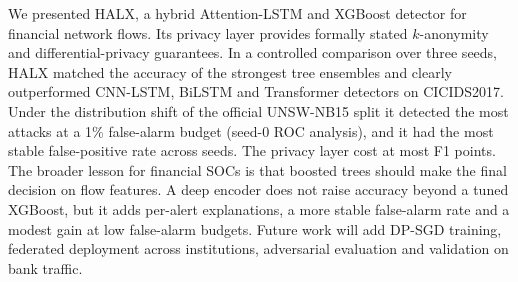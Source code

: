 We presented HALX, a hybrid Attention-LSTM and XGBoost detector for
financial network flows. Its privacy layer provides formally stated
$k$-anonymity and differential-privacy guarantees. In a controlled
comparison over three seeds, HALX matched the accuracy of the strongest
tree ensembles and clearly outperformed CNN-LSTM, BiLSTM and Transformer
detectors on CICIDS2017. Under the distribution shift of the official
UNSW-NB15 split it detected the most attacks at a 1\% false-alarm budget
(seed-0 ROC analysis), and it had the most stable false-positive rate
across seeds. The privacy layer
cost at most \PRIVCOSTMAX{} F1 points. The broader
lesson for financial SOCs is that boosted trees should make the final
decision on flow features. A deep encoder does not raise accuracy beyond
a tuned XGBoost, but it adds per-alert explanations, a more stable false-alarm
rate and a modest gain at low false-alarm budgets. Future work will add DP-SGD training,
federated deployment across institutions, adversarial evaluation and
validation on bank traffic.
